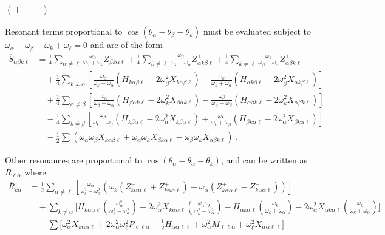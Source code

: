 \documentclass[letterpaper,11pt]{article}
\newcommand{\ok}{\omega_k}
\newcommand{\ol}{\omega_\ell}
\newcommand{\thk}{\theta_k}
\newcommand{\oal}{\omega_\alpha}
\newcommand{\obet}{\omega_{\beta}}
\begin{document}
\subsubsection{$(+--)$}
Resonant terms proportional to $\cos \left(\theta_\alpha - \theta_\beta - \theta_k \right)$ must be evaluated subject to $\omega_\alpha - \omega_\beta - \omega_k + \ol = 0$ and are of the form
\begin{align}
\overline{S}_{\alpha \beta k \ell} &= \frac{1}{4} \sum_{\alpha \neq \ell} \frac{\omega_\alpha}{\omega_\beta + \omega_k} Z^{-}_{\beta k \alpha \ell} + \frac{1}{4} \sum_{\beta \neq \ell} \frac{\omega_\beta}{\ok - \omega_{\alpha}} Z^{+}_{\alpha k \beta \ell} + \frac{1}{4} \sum_{k \neq \ell} \frac{\ok}{\obet - \omega_\alpha} Z^{+}_{\alpha \beta k \ell} \nonumber \\
%
& \quad + \frac{1}{4} \sum_{k \neq \alpha} \left[ \frac{\oal}{\ok - \oal} (H_{k \alpha \beta \ell} - 2 \obet^2 X_{k \alpha \beta \ell}) - \frac{\ok}{\ok + \oal} (H_{\alpha k \beta \ell} - 2\obet^2 X_{\alpha k \beta \ell}) \right] \nonumber \\
%
& \quad + \frac{1}{4} \sum_{\alpha \neq \beta} \left[ \frac{\oal}{\obet - \oal} (H_{\beta \alpha k \ell} - 2\ok^2 X_{\beta \alpha k \ell}) - \frac{\obet}{\oal + \obet}(H_{\alpha \beta k \ell} - 2 \ok^2 X_{\alpha \beta k \ell}) \right] \nonumber \\
%
& \quad - \frac{1}{4} \sum_{k \neq \beta} \left[ \frac{\obet}{\ok + \obet} (H_{k \beta \alpha \ell} - 2\oal^2 X_{k \beta \alpha \ell}) + \frac{\ok}{\ok + \obet}(H_{\beta k \alpha \ell} - 2\oal^2 X_{\beta k \alpha \ell}) \right] \nonumber \\
%
& \quad - \frac{1}{2} \sum \left( \oal \obet X_{k \alpha \beta \ell} + \oal \ok X_{\beta k \alpha \ell} - \obet \ok X_{\alpha \beta k \ell} \right) \, .
\end{align}

Other resonances are proportional to $\cos \left( \theta_\alpha - \theta_\alpha - \thk \right)$, and can be written as $\overline{R}_{\ell \alpha}$ where
\begin{align}
\overline{R}_{k \alpha} &= \frac{1}{2} \sum_{\alpha \neq \ell} \left[ \frac{\oal}{\ol^2 - \oal^2} \left( \ok (Z^{-}_{k \alpha \alpha \ell} + Z^{+}_{k \alpha \alpha \ell} ) + \oal (Z^{+}_{k \alpha \alpha \ell} - Z^{-}_{k \alpha \alpha \ell} ) \right) \right]  \nonumber \\
%
& \quad + \sum_{k \neq \alpha} \bigg[ H_{k \alpha \alpha \ell} \left( \frac{\oal^2}{\ol^2 - \oal^2} \right) - 2 \oal^2 X_{k \alpha \alpha \ell} \left( \frac{\oal \ok}{\ok^2 - \oal^2} \right) - H_{\alpha k \alpha \ell} \left( \frac{\ok}{\ok + \oal} \right)   - 2 \oal^2 X_{\alpha k \alpha \ell} \left( \frac{\ok}{\ok + \oal} \right) \bigg] \nonumber \\
%
& \quad  - \sum \Big[ \oal^2 X_{k \alpha \alpha \ell} + 2 \oal^2 \ol^2 P_{\ell \ell \alpha} + \frac{1}{2} H_{\alpha \alpha \ell \ell} + \oal^2 M_{\ell \ell \alpha} + \ol^2 X_{\alpha \alpha \ell \ell} \Big]
\end{align}
\end{document}
